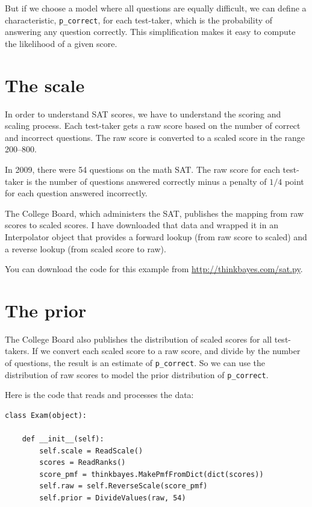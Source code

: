 \documentclass[12pt]{book}
\begin{document}
But if we choose a model where all questions are equally difficult, we
can define a characteristic, \verb"p_correct", for each test-taker,
which is the probability of answering any question correctly.  This
simplification makes it easy to compute the likelihood of a given
score.


\section{The scale}

In order to understand SAT scores, we have to understand the scoring
and scaling process.  Each test-taker gets a raw score based on the
number of correct and incorrect questions.  The raw score is converted
to a scaled score in the range 200--800.

In 2009, there were 54 questions on the math SAT.  The raw score
for each test-taker is the number of questions answered correctly
minus a penalty of $1/4$ point for each question answered incorrectly.

The College Board, which administers the SAT, publishes the
mapping from raw scores to scaled scores.  I have downloaded that
data and wrapped it in an Interpolator object that provides a forward
lookup (from raw score to scaled) and a reverse lookup (from scaled
score to raw).

You can download the code for this example from
\url{http://thinkbayes.com/sat.py}.


\section{The prior}

The College Board also publishes the distribution of scaled scores
for all test-takers.  If we convert each scaled score to a raw score,
and divide by the number of questions, the result is an estimate
of \verb"p_correct".
So we can use the distribution of raw scores to model the
prior distribution of \verb"p_correct".

Here is the code that reads and processes the data:

\begin{verbatim}
class Exam(object):

    def __init__(self):
        self.scale = ReadScale()
        scores = ReadRanks()
        score_pmf = thinkbayes.MakePmfFromDict(dict(scores))
        self.raw = self.ReverseScale(score_pmf)
        self.prior = DivideValues(raw, 54)
\end{verbatim}
\end{document}
